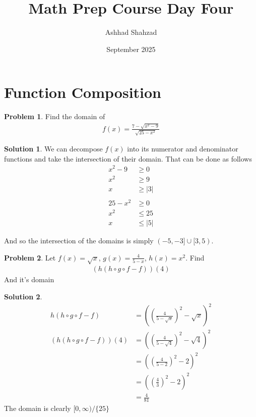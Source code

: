\documentclass[a4paper]{article}
\title{Math Prep Course Day Four}
\author{Ashhad Shahzad}
\date{September 2025}
\theoremstyle{definition}
\newtheorem{problem}{Problem}[section]
\newtheorem*{solution}{Solution}
\begin{document}
\maketitle

\section{Function Composition}

\begin{problem}
Find the domain of
\begin{align*}
f(x) = \frac{7 -\sqrt{x^2-9}}{\sqrt{25-x^2}}
\end{align*}
\end{problem}
\begin{solution}
We can decompose \(f(x)\) into its numerator and denominator functions and take the intersection of their domain. That can be done as follows
\begin{align*}
x^2 - 9 &\geq 0 \\
x^2 &\geq 9 \\
x &\geq |3| \\ \\
25 - x^2 &\geq 0 \\
x^2 &\leq 25 \\
x &\leq |5|
\end{align*}

And so the intersection of the domains is simply \((-5, -3] \cup [3, 5)\).
\end{solution}


\begin{problem}
Let \(f(x) = \sqrt{x}\), \(g(x) = \frac{4}{5-x}\), \(h(x) = x^2\). Find
\begin{align*}
(h(h \circ g\circ f - f))(4)
\end{align*}
And it's domain
\end{problem}

\begin{solution}
\begin{align*}
h(h \circ g \circ f- f) &= \left(\left(\frac{4}{5-\sqrt{x}}\right)^2 -\sqrt{x}\right)^2 \\
(h(h \circ g\circ f -f))(4) &= \left(\left(\frac{4}{5-\sqrt{4}}\right)^2 - \sqrt{4}\right)^2 \\
    &= \left(\left(\frac{4}{5-2}\right)^2 - 2\right)^2 \\
    &= \left(\left(\frac{4}{3}\right)^2 - 2\right)^2 \\
    &= \frac{4}{81}
\end{align*}
The domain is clearly \([0, \infty)/\{25\}\)
\end{solution}
\end{document}
